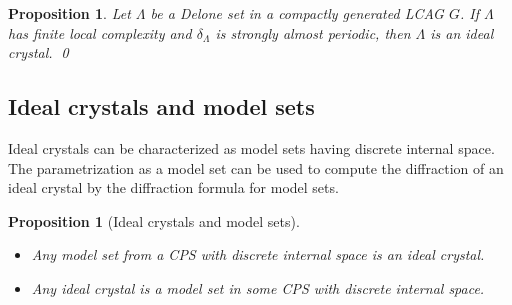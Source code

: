 \documentclass[11pt, a4wide]{amsart}
\newtheorem{proposition}[lemma]{Proposition}
\numberwithin{lemma}{section}
\begin{document}
\begin{proposition}\cite[Cor.~5.6]{KL13}\label{prop:charidcryst}
Let $\Lambda$ be a Delone set in a compactly generated LCAG $G$. If $\Lambda$ has finite local complexity and $\delta_\Lambda$ is strongly almost periodic, then $\Lambda$ is an ideal crystal.
\qed
\end{proposition}

\subsection{Ideal crystals and model sets}

Ideal crystals can be characterized as model sets having discrete internal space. The parametrization as a model set can be used to compute the diffraction of an ideal crystal by the diffraction formula for model sets.

\begin{proposition}[Ideal crystals and model sets]\label{lem:icasms}

\begin{itemize}
\item[(i)] Any model set from a CPS with discrete internal space is an ideal crystal.
\item[(ii)] Any ideal crystal is a model set in some CPS with discrete internal space.
\end{itemize}
\end{proposition}
\end{document}
